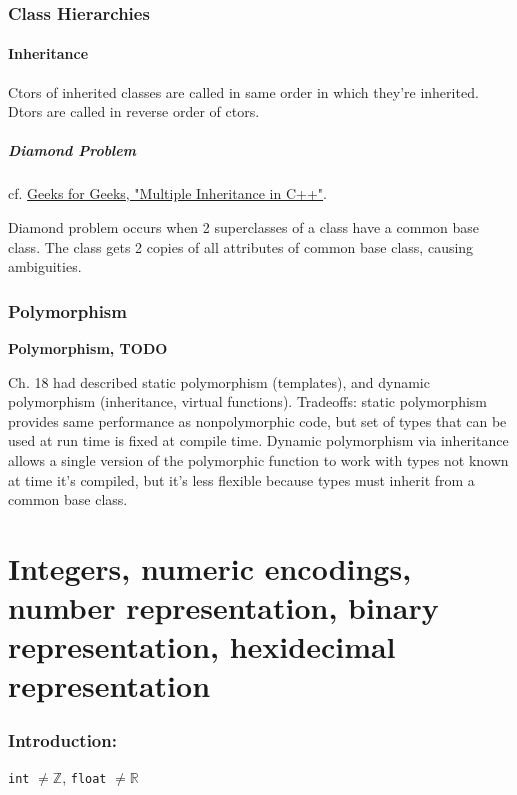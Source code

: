 \documentclass[10pt]{amsart}
\begin{document}
\section{Class Hierarchies}

\subsection{Inheritance}

Ctors of inherited classes are called in same order in which they're inherited. Dtors are called in reverse order of ctors.

\subsubsection{Diamond Problem}

cf. \href{https://www.geeksforgeeks.org/multiple-inheritance-in-c/}{Geeks for Geeks, "Multiple Inheritance in C++"}.

Diamond problem occurs when 2 superclasses of a class have a common base class. The class gets 2 copies of all attributes of common base class, causing ambiguities.

\section{Polymorphism}

\textbf{Polymorphism, TODO}

Ch. 18 had described static polymorphism (templates), and dynamic polymorphism (inheritance, virtual functions). Tradeoffs: static polymorphism provides same performance as nonpolymorphic code, but set of types that can be used at run time is fixed at compile time. Dynamic polymorphism via inheritance allows a single version of the polymorphic function to work with types not known at time it's compiled, but it's less flexible because types must inherit from a common base class.


\part{Integers, numeric encodings, number representation, binary representation, hexidecimal representation}

\section{Introduction:} 
\texttt{int} $\neq \mathbb{Z}$, \texttt{float} $\neq \mathbb{R}$
\end{document}
